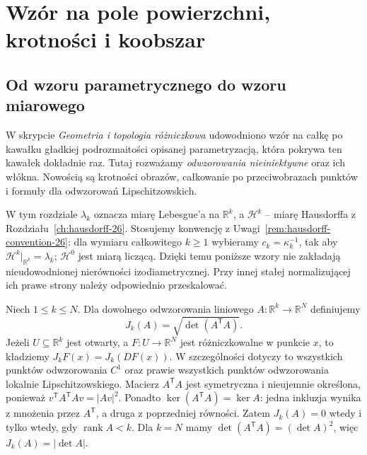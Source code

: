 \chapter{Wzór na pole powierzchni, krotności i koobszar}
\label{ch:area-coarea-28}

\providecommand{\atlasref}[2]{#2}


\section{Od wzoru parametrycznego do wzoru miarowego}
W skrypcie \emph{Geometria i topologia różniczkowa}
udowodniono wzór na całkę po kawałku gładkiej
podrozmaitości opisanej parametryzacją, która
pokrywa ten kawałek dokładnie raz. Tutaj rozważamy
\emph{odwzorowania nieiniektywne} oraz ich włókna.
Nowością są krotności obrazów, całkowanie po
przeciwobrazach punktów i formuły dla
odwzorowań Lipschitzowskich.

W tym rozdziale $\lambda_k$ oznacza miarę Lebesgue'a
na $\mathbb R^k$, a $\mathcal H^k$ -- miarę
Hausdorffa z Rozdziału~\ref{ch:hausdorff-26}.
Stosujemy konwencję z
Uwagi~\ref{rem:hausdorff-convention-26}: dla wymiaru
całkowitego $k\ge1$ wybieramy $c_k=\kappa_k^{-1}$,
tak aby $\mathcal H^k|_{\mathbb R^k}=\lambda_k$;
$\mathcal H^0$ jest miarą liczącą.
Dzięki temu poniższe wzory nie zakładają
nieudowodnionej nierówności izodiametrycznej.
Przy innej stałej normalizującej ich prawe strony
należy odpowiednio przeskalować.

\begin{definicja}
\label{def:k-jacobian-28}
Niech $1\le k\le N$. Dla dowolnego odwzorowania
liniowego $A:\mathbb R^k\to\mathbb R^N$ definiujemy
\[
 J_k(A)=\sqrt{\det(A^{\mathsf T}A)}.
\]
Jeżeli $U\subseteq\mathbb R^k$ jest otwarty,
a $F:U\to\mathbb R^N$ jest różniczkowalne
w punkcie $x$, to kładziemy $J_kF(x)=J_k(DF(x))$.
W szczególności dotyczy to wszystkich punktów odwzorowania
$C^1$ oraz prawie wszystkich punktów odwzorowania
lokalnie Lipschitzowskiego. Macierz $A^{\mathsf T}A$ jest symetryczna i nieujemnie
określona, ponieważ $v^{\mathsf T}A^{\mathsf T}Av=|Av|^2$.
Ponadto $\ker(A^{\mathsf T}A)=\ker A$: jedna inkluzja
wynika z mnożenia przez $A^{\mathsf T}$, a druga z
poprzedniej równości. Zatem $J_k(A)=0$ wtedy i tylko
wtedy, gdy $\operatorname{rank}A<k$. Dla $k=N$
mamy $\det(A^{\mathsf T}A)=(\det A)^2$, więc
$J_k(A)=|\det A|$.
\end{definicja}

